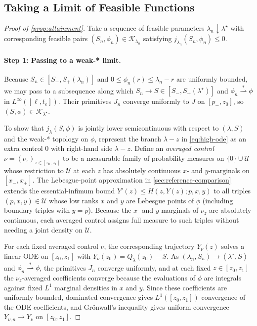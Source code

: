 \documentclass[11pt]{article}
\numberwithin{equation}{section}
\theoremstyle{plain}
\theoremstyle{definition}
\newcommand{\1}{\mathbf{1}}
\newcommand{\calK}{\mathcal{K}}
\newcommand{\calU}{\mathcal{U}}
\begin{document}
\subsection{Taking a Limit of Feasible Functions}
\label{app:attainment}

\begin{proof}[Proof of {\cref{prop:attainment}}]
Take a sequence of feasible parameters $\lambda_n \downarrow \lambda^\star$ with corresponding feasible pairs $(S_n, \phi_n) \in \calK_{\lambda_n}$ satisfying $j_{\lambda_n}(S_n, \phi_n) \le 0$.

\paragraph{Step 1: Passing to a weak-* limit.}
Because $S_n \in [S_-, S_+(\lambda_n)]$ and $0 \le \phi_n(r) \le \lambda_n - r$ are uniformly bounded, we may pass to a subsequence along which $S_n \to S \in [S_-, S_+(\lambda^\star)]$ and $\phi_n \stackrel{*}{\rightharpoonup} \phi$ in $L^\infty([\ell, t_e])$. Their primitives $J_n$ converge uniformly to $J$ on $[p_-, z_0]$, so $(S, \phi) \in \calK_{\lambda^\star}$.

To show that $j_\lambda(S, \phi)$ is jointly lower semicontinuous with respect to $(\lambda, S)$ and the weak-* topology on $\phi$, represent the branch $\lambda - z$ in \cref{eq:high-ode} as an extra control $0$ with right-hand side $\lambda - z$. Define an \emph{averaged control} $\nu = (\nu_z)_{z \in [z_0, z_1]}$ to be a measurable family of probability measures on $\{0\} \cup \calU$ whose restriction to $\calU$ at each $z$ has absolutely continuous $x$- and $y$-marginals on $[x_-, x_+]$. The Lebesgue-point approximation in \cref{sec:reference-comparison} extends the essential-infimum bound $Y'(z) \le H(z, Y(z); p, x, y)$ to all triples $(p, x, y) \in \calU$ whose low ranks $x$ and $y$ are Lebesgue points of $\phi$ (including boundary triples with $y = p$). Because the $x$- and $y$-marginals of $\nu_z$ are absolutely continuous, each averaged control assigns full measure to such triples without needing a joint density on $\calU$.

For each fixed averaged control $\nu$, the corresponding trajectory $Y_\nu(z)$ solves a linear ODE on $[z_0, z_1]$ with $Y_\nu(z_0) = Q_\lambda(z_0) - S$. As $(\lambda_n, S_n) \to (\lambda^\star, S)$ and $\phi_n \stackrel{*}{\rightharpoonup} \phi$, the primitives $J_n$ converge uniformly, and at each fixed $z \in [z_0, z_1]$ the $\nu_z$-averaged coefficients converge because the evaluations of $\phi$ are integrals against fixed $L^1$ marginal densities in $x$ and $y$. Since these coefficients are uniformly bounded, dominated convergence gives $L^1([z_0, z_1])$ convergence of the ODE coefficients, and Gr\"onwall's inequality gives uniform convergence $Y_{\nu, n} \to Y_\nu$ on $[z_0, z_1]$.


\end{proof}
\end{document}
